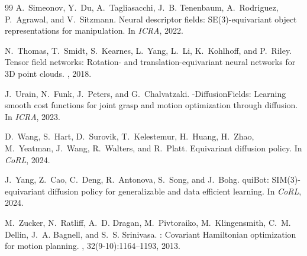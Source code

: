 \documentclass[10pt,twocolumn,letterpaper]{article}
\theoremstyle{plain}
\begin{document}
\begin{thebibliography}{99}
A.~Simeonov, Y.~Du, A.~Tagliasacchi, J.~B. Tenenbaum, A.~Rodriguez, P.~Agrawal,
  and V.~Sitzmann.
\newblock Neural descriptor fields: {SE(3)}-equivariant object representations
  for manipulation.
\newblock In {\em ICRA}, 2022.

N.~Thomas, T.~Smidt, S.~Kearnes, L.~Yang, L.~Li, K.~Kohlhoff, and P.~Riley.
\newblock Tensor field networks: Rotation- and translation-equivariant neural
  networks for 3{D} point clouds.
, 2018.

J.~Urain, N.~Funk, J.~Peters, and G.~Chalvatzaki.
-{D}iffusion{F}ields: Learning smooth cost functions for joint
  grasp and motion optimization through diffusion.
\newblock In {\em ICRA}, 2023.

D.~Wang, S.~Hart, D.~Surovik, T.~Kelestemur, H.~Huang, H.~Zhao, M.~Yeatman,
  J.~Wang, R.~Walters, and R.~Platt.
\newblock Equivariant diffusion policy.
\newblock In {\em CoRL}, 2024.

J.~Yang, Z.~Cao, C.~Deng, R.~Antonova, S.~Song, and J.~Bohg.
qui{B}ot: {SIM(3)}-equivariant diffusion policy for generalizable
  and data efficient learning.
\newblock In {\em CoRL}, 2024.

M.~Zucker, N.~Ratliff, A.~D. Dragan, M.~Pivtoraiko, M.~Klingensmith, C.~M.
  Dellin, J.~A. Bagnell, and S.~S. Srinivasa.
: Covariant Hamiltonian optimization for motion planning.
, 32(9-10):1164--1193, 2013.

\end{thebibliography}
\end{document}
